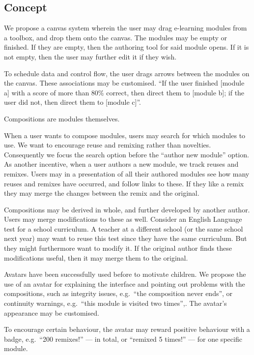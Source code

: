 \subsection{Concept }
We propose a canvas system wherein the user may drag e-learning modules from a 
toolbox, and drop them onto the canvas. The modules may be empty or finished. 
If they are empty, then the authoring tool for said module opens. If it is not 
empty, then the user may further edit it if they wish.

To schedule data and control flow, the user drags arrows between the modules 
on the canvas. These associations may be customised. ``If the user finished 
[module a] with a score of more than 80\% correct, then direct them to [module 
b]; if the user did not, then direct them to [module c]''.

Compositions are modules themselves.

When a user wants to compose modules, users may search for which modules to 
use. We want to encourage reuse and remixing rather than novelties. 
Consequently we focus the search option before the ``author new module'' 
option. As another incentive, when a user authors a new module, we track 
reuses and remixes. Users may in a presentation of all their authored modules 
see how many reuses and remixes have occurred, and follow links to these. If 
they like a remix they may merge the changes between the remix and the 
original.

Compositions may be derived in whole, and further developed by another author. 
Users may merge modifications to these as well. Consider an English Language 
test for a school curriculum. A teacher at a different school (or the same 
school next year) may want to reuse this test since they have the same 
curriculum. But they might furthermore want to modify it. If the original 
author finds these modifications useful, then it may merge them to the 
original.

Avatars have been successfully used before to motivate 
children\cite{gossen2012search}. We propose the use of an avatar for 
explaining the interface and pointing out problems with the compositions, such 
as integrity issues, e.g.\ ``the composition never ends'', or continuity 
warnings, e.g.\ ``this module is visited two times'',. The avatar's appearance 
may be customised.

To encourage certain behaviour, the avatar may reward positive behaviour with 
a badge, e.g.\ ``200 remixes!'' --- in total, or ``remixed 5 times!'' --- for 
one specific module.

